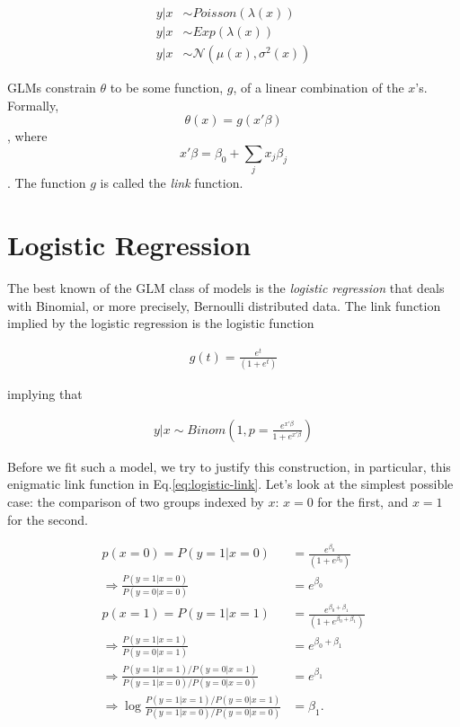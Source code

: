 \documentclass[]{book}
\theoremstyle{definition}
\theoremstyle{definition}
\theoremstyle{remark}
\begin{document}
\begin{align}
 y|x &\sim Poisson(\lambda(x)) \\
 y|x &\sim Exp(\lambda(x)) \\
 y|x &\sim \mathcal{N}(\mu(x),\sigma^2(x)) 
\end{align}

GLMs constrain \(\theta\) to be some function, \(g\), of a linear
combination of the \(x\)'s. Formally, \[\theta(x)=g(x'\beta)\], where
\[x'\beta=\beta_0 + \sum_j x_j \beta_j\]. The function \(g\) is called
the \emph{link} function.

\section{Logistic Regression}\label{logistic-regression}

The best known of the GLM class of models is the \emph{logistic
regression} that deals with Binomial, or more precisely, Bernoulli
distributed data. The link function implied by the logistic regression
is the logistic function

\begin{align}
  g(t)=\frac{e^t}{(1+e^t)}
  \label{eq:logistic-link}  
\end{align}

implying that

\begin{align}
  y|x \sim Binom \left( 1, p=\frac{e^{x'\beta}}{1+e^{x'\beta}} \right)
  \label{eq:logistic}
\end{align}

Before we fit such a model, we try to justify this construction, in
particular, this enigmatic link function in Eq.\eqref{eq:logistic-link}.
Let's look at the simplest possible case: the comparison of two groups
indexed by \(x\): \(x=0\) for the first, and \(x=1\) for the second.

\begin{align}
   p(x=0)=P(y=1|x=0) &= \frac{e^{\beta_0}}{(1+e^{\beta_0})} \label{eq:odds-one} \\ 
   \Rightarrow 
   \frac{P(y=1|x=0)}{P(y=0|x=0)} &= e^{\beta_0} \\
   p(x=1)= P(y=1|x=1) &= \frac{e^{\beta_0+\beta_1}}{(1+e^{\beta_0+\beta_1})} \\
   \Rightarrow 
   \frac{P(y=1|x=1)}{P(y=0|x=1)} &= e^{\beta_0+\beta_1} \label{eq:odds-two}\\
   \Rightarrow 
   \frac{P(y=1|x=1)/P(y=0|x=1)}{P(y=1|x=0)/P(y=0|x=0)} 
   &= e^{\beta_1}  \label{eq:odds-ratio} \\
   \Rightarrow 
   \log \frac{P(y=1|x=1)/P(y=0|x=1)}{P(y=1|x=0)/P(y=0|x=0)} &= \beta_1. \label{eq:log-odds-ratio}
\end{align}
\end{document}
